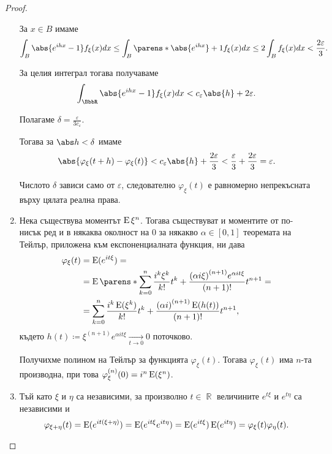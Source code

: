 \documentclass{../../common/topic}
\begin{document}
\begin{proof}
\begin{enumerate}
    За \( x \in B \) имаме
    \begin{equation*}
      \int_B \abs{e^{ihx} - 1} f_\xi(x) dx
      \leq
      \int_B \parens*{ \abs{e^{ihx}} + 1 } f_\xi(x) dx
      \leq
      2 \int_B f_\xi(x) dx
      <
      \frac {2\varepsilon} 3.
    \end{equation*}

    За целия интеграл тогава получаваме
    \begin{equation*}
      \int_{\BbbR} \abs{e^{ihx} - 1} f_\xi(x) dx
      <
      c_\varepsilon \abs{h} + 2 \varepsilon.
    \end{equation*}

    Полагаме \( \delta = \frac \varepsilon {3 c_\varepsilon} \).

    Тогава за \( \abs h < \delta \) имаме
    \begin{equation*}
      \abs{\varphi_\xi(t + h) - \varphi_\xi(t)}
      <
      c_\varepsilon \abs{h} + \frac {2\varepsilon} 3
      <
      \frac {\varepsilon} 3 + \frac {2\varepsilon} 3
      =
      \varepsilon.
    \end{equation*}

    Числото \( \delta \) зависи само от \( \varepsilon \), следователно \( \varphi_\xi(t) \) е равномерно непрекъсната върху цялата реална права.

    \item Нека съществува моментът \( \operatorname{E} \xi^n \). Тогава съществуват и моментите от по-нисък ред и в някаква околност на \( 0 \) за някакво \( \alpha \in [0, 1] \) теоремата на Тейлър, приложена към експоненциалната функция, ни дава
    \begin{align*}
      \varphi_\xi(t)
      &=
      \Expect(e^{it\xi})
      = \\ &=
      \Expect\parens*{\sum_{k=0}^n \frac {i^k \xi^k} {k!} t^k + \frac {{(\alpha i \xi)}^{(n+1)} e^{\alpha it \xi}} {(n+1)!} t^{n+1} }
      = \\ &=
      \sum_{k=0}^n \frac {i^k \Expect(\xi^k)} {k!} t^k + \frac {{(\alpha i)}^{(n+1)} \Expect(h(t))} {(n+1)!} t^{n+1},
    \end{align*}
    където \( h(t) \coloneqq \xi^{(n+1)} e^{\alpha it \xi} \xrightarrow[t \to 0]{} 0 \) поточково.

    Получихме полином на Тейлър за функцията \( \varphi_\xi(t) \). Тогава \( \varphi_\xi(t) \) има \( n \)-та производна, при това \( \varphi^{(n)}_\xi(0) = i^n \operatorname{E}(\xi^n) \).

    \item Тъй като \( \xi \) и \( \eta \) са независими, за произволно \( t \in \BbbR \) величините \( e^{t\xi} \) и \( e^{t\eta} \) са независими и
    \begin{equation*}
      \varphi_{\xi + \eta}(t)
      =
      \operatorname{E}(e^{it(\xi + \eta)})
      =
      \operatorname{E}(e^{it\xi} e^{it\eta})
      =
      \operatorname{E}(e^{it\xi}) \operatorname{E}(e^{it\eta})
      =
      \varphi_\xi(t) \varphi_\eta(t).
    \end{equation*}


\end{enumerate}
\end{proof}
\end{document}
